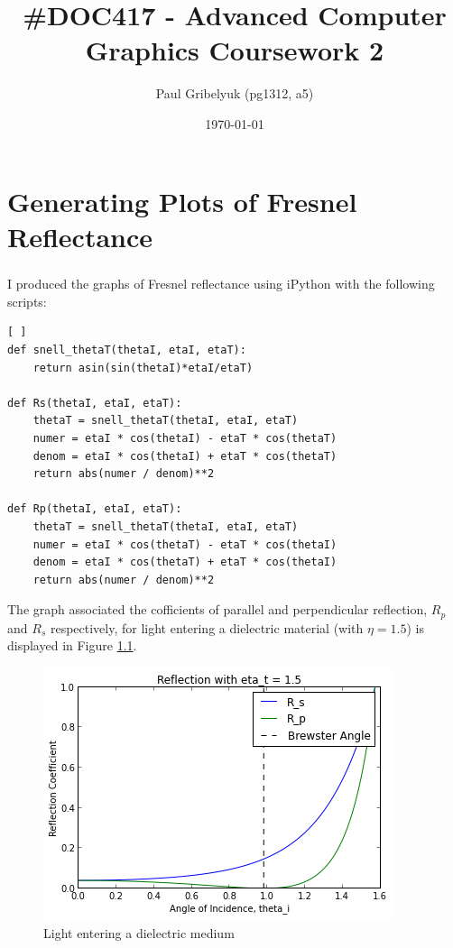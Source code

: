 \documentclass[a4paper,12pt,oneside,final]{report}
\author{Paul Gribelyuk (pg1312, a5)}
\title{\Huge \#DOC417 - Advanced Computer Graphics Coursework 2}
\date{\today}
\newenvironment{changemargin}[2]{\begin{list}{}{%
\setlength{\topsep}{0pt}%
\setlength{\leftmargin}{0pt}%
\setlength{\rightmargin}{0pt}%
\setlength{\listparindent}{\parindent}%
\setlength{\itemindent}{\parindent}%
\setlength{\parsep}{0pt plus 1pt}%
\addtolength{\leftmargin}{#1}%
\addtolength{\rightmargin}{#2}%
}\item }{\end{list}}
\begin{document}
\maketitle
\listoffigures
\chapter{Generating Plots of Fresnel Reflectance}
\paragraph{}
I produced the graphs of Fresnel reflectance using iPython with the following scripts:
\begin{lstlisting}[ ]
def snell_thetaT(thetaI, etaI, etaT):
    return asin(sin(thetaI)*etaI/etaT)

def Rs(thetaI, etaI, etaT):
    thetaT = snell_thetaT(thetaI, etaI, etaT)
    numer = etaI * cos(thetaI) - etaT * cos(thetaT)
    denom = etaI * cos(thetaI) + etaT * cos(thetaT)
    return abs(numer / denom)**2

def Rp(thetaI, etaI, etaT):
    thetaT = snell_thetaT(thetaI, etaI, etaT)
    numer = etaI * cos(thetaT) - etaT * cos(thetaI)
    denom = etaI * cos(thetaT) + etaT * cos(thetaI)
    return abs(numer / denom)**2
\end{lstlisting}
The graph associated the cofficients of parallel and perpendicular reflection, $R_p$ and $R_s$ respectively, for light entering a dielectric material (with $\eta = 1.5$) is displayed in Figure \ref{fig:fresnel1}.
\begin{figure}[!h]
  \begin{changemargin}{-50mm}{-50mm}
    \center
    \includegraphics[scale=0.8]{fresnel1.png}
    \caption{Light entering a dielectric medium \label{fig:fresnel1}}
  \end{changemargin}
\end{figure}
\end{document}
